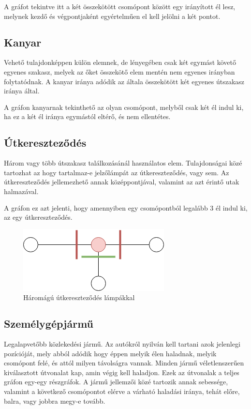 A gráfot tekintve itt a két összekötött csomópont között egy irányított él lesz, melynek kezdő és végpontjaként egyértelműen el kell jelölni a két pontot.
\subsection{Kanyar}
Vehető tulajdonképpen külön elemnek, de lényegében csak két egymást követő egyenes szakasz, melyek az őket összekötő elem mentén nem egyenes irányban folytatódnak. A kanyar iránya adódik az általa összekötött két egyenes útszakasz iránya által.

A gráfon kanyarnak tekinthető az olyan csomópont, melyből csak két él indul ki, ha ez a két él iránya egymástól eltérő, és nem ellentétes.
\subsection{Útkereszteződés}
Három vagy több útszakasz találkozásánál használatos elem. Tulajdonságai közé tartozhat az hogy tartalmaz-e jelzőlámpát az útkereszteződés, vagy sem.
Az útkereszteződés jellemezhető annak középpontjával, valamint az azt érintő utak halmazával.

A gráfon ez azt jelenti, hogy amennyiben egy csomópontból legalább 3 él indul ki, az egy útkereszteződés.
\begin{figure}[H]
\includegraphics[width=\linewidth]{utkereszt.png}
\caption{Háromágú útkereszteződés lámpákkal}
\label{fig:xroad}
\end{figure}
\subsection{Személygépjármű}
Legalapvetőbb közlekedési jármű. Az autókról nyilván kell tartani azok jelenlegi pozícióját, mely abból adódik hogy éppen melyik élen haladnak, melyik csomópont felé, és attól milyen távolságra vannak. Minden jármű véletlenszerűen kiválasztott útvonalat kap, amin végig kell haladjon. Ezek az útvonalak a teljes gráfon egy-egy részgráfok. A jármű jellemzői közé tartozik annak sebessége, valamint a következő csomópontot elérve a várható haladási iránya, tehát előre, balra, vagy jobbra megy-e tovább. 

